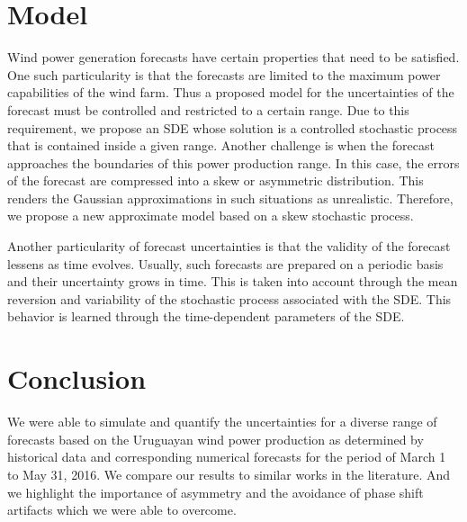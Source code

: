 \documentclass[a4paper, 12pt]{article}
\begin{document}
\section{Model}
Wind power generation forecasts have certain properties that need to be satisfied. One such particularity is that the forecasts are limited to the maximum power capabilities of the wind farm. Thus a proposed model for the uncertainties of the forecast must be controlled and restricted to a certain range. Due to this requirement, we propose an SDE whose solution is a controlled stochastic process that is contained inside a given range. Another challenge is when the forecast approaches the boundaries of this power production range. In this case, the errors of the forecast are compressed into a skew or asymmetric distribution. This renders the Gaussian approximations in such situations as unrealistic. Therefore, we propose a new approximate model based on a skew stochastic process.

Another particularity of forecast uncertainties is that the validity of the forecast lessens as time evolves. Usually, such forecasts are prepared on a periodic basis and their uncertainty grows in time. This is taken into account through the mean reversion and variability of the stochastic process associated with the SDE. This behavior is learned through the time-dependent parameters of the SDE.

\section{Conclusion}
We were able to simulate and quantify the uncertainties for a diverse range of forecasts based on the Uruguayan wind power production as determined by historical data and corresponding numerical forecasts for the period of March 1 to May 31, 2016. We compare our results to similar works in the literature. And we highlight the importance of asymmetry and the avoidance of phase shift artifacts which we were able to overcome.
 

\end{document}
